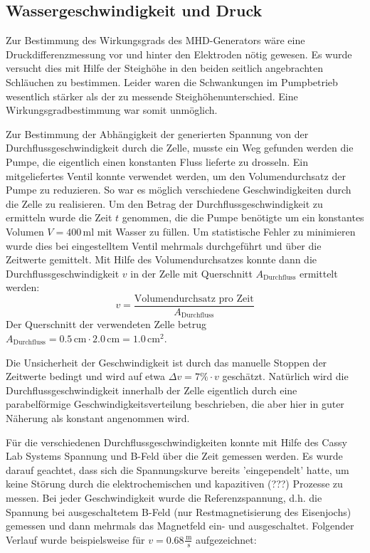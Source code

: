 \documentclass[11pt]{scrartcl}
\newcommand{\unit}[1]{\ensuremath{\,\mathrm{#1}}} %
\begin{document}
\subsection{Wassergeschwindigkeit und Druck}		%
Zur Bestimmung des Wirkungsgrads des MHD-Generators wäre eine Druckdifferenzmessung vor und hinter den Elektroden nötig gewesen.
Es wurde versucht dies mit Hilfe der Steighöhe in den beiden seitlich angebrachten Schläuchen zu bestimmen. Leider waren die Schwankungen im Pumpbetrieb wesentlich stärker als der zu messende Steighöhenunterschied.
Eine Wirkungsgradbestimmung war somit unmöglich.

Zur Bestimmung der Abhängigkeit der generierten Spannung von der Durchflussgeschwindigkeit durch die Zelle, musste ein Weg gefunden werden die Pumpe, die eigentlich einen konstanten Fluss lieferte zu drosseln.
Ein mitgeliefertes Ventil konnte verwendet werden, um den Volumendurchsatz der Pumpe zu reduzieren. So war es möglich verschiedene Geschwindigkeiten durch die Zelle zu realisieren.
Um den Betrag der Durchflussgeschwindigkeit zu ermitteln wurde die Zeit $t$ genommen, die die Pumpe benötigte um ein konstantes Volumen $V=400\unit{ml}$ mit Wasser zu füllen. Um statistische Fehler zu minimieren wurde dies bei eingestelltem Ventil mehrmals durchgeführt und über die Zeitwerte gemittelt.
Mit Hilfe des Volumendurchsatzes konnte dann die Durchflussgeschwindigkeit $v$ in der Zelle mit Querschnitt $A_{\text{Durchfluss}}$ ermittelt werden:
\[
v=\frac{\text{Volumendurchsatz pro Zeit}}{A_{\text{Durchfluss}}}
\]
Der Querschnitt der verwendeten Zelle betrug $A_{\text{Durchfluss}}=0.5\unit{cm} \cdot 2.0\unit{cm}=1.0\unit{cm^{2}}$.

Die Unsicherheit der Geschwindigkeit ist durch das manuelle Stoppen der Zeitwerte bedingt und wird auf etwa $\Delta v=7\% \cdot v$ geschätzt.
Natürlich wird die Durchflussgeschwindigkeit innerhalb der Zelle eigentlich durch eine parabelförmige Geschwindigkeitsverteilung beschrieben, die aber hier in guter Näherung als konstant angenommen wird. 

Für die verschiedenen Durchflussgeschwindigkeiten konnte mit Hilfe des Cassy Lab Systems Spannung und B-Feld über die Zeit gemessen werden. Es wurde darauf geachtet, dass sich die Spannungskurve bereits 'eingependelt' hatte, um keine Störung durch die elektrochemischen und kapazitiven (???) Prozesse zu messen.
Bei jeder Geschwindigkeit wurde die Referenzspannung, d.h. die Spannung bei ausgeschaltetem B-Feld (nur Restmagnetisierung des Eisenjochs) gemessen und dann mehrmals das Magnetfeld ein- und ausgeschaltet.
Folgender Verlauf wurde beispielsweise für $v=0.68\frac{\unit{m}}{\unit{s}}$ aufgezeichnet:
\end{document}
